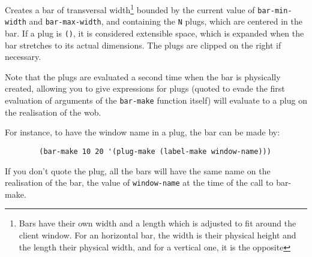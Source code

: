 Creates a bar of transversal width\footnote{Bars have their own width and a
length which is adjusted to fit around the client window. For an horizontal
bar, the width is their physical height and the length their physical width,
and for a vertical one, it is the opposite} bounded by the current value
of \verb"bar-min-width" and \verb"bar-max-width", and containing the {\tt N}
plugs, which are centered in the bar.  If a plug is \verb"()", it is
considered extensible space, which is expanded when the bar stretches to its
actual dimensions.  The plugs are clipped on the right if necessary.


Note that the plugs are evaluated a second time when the bar is physically
created, allowing you to give expressions for plugs (quoted to evade the
first evaluation of arguments of the \verb"bar-make" function itself)
will evaluate to a plug on the realisation of the wob.  

For instance, to have the window name in a plug, the bar can be made by:
{\exemplefont\begin{verbatim}
        (bar-make 10 20 '(plug-make (label-make window-name)))
\end{verbatim}}
If you don't quote the plug, all the bars will have the same name on the
realisation of the bar, the value of \verb"window-name" at the time of the
call to bar-make.

